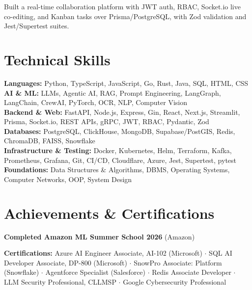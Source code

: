 \documentclass[a4paper,10pt]{article}
\begin{document}
\begin{points}
  \item Built a real-time collaboration platform with JWT auth, RBAC, Socket.io live co-editing, and Kanban tasks over Prisma/PostgreSQL, with Zod validation and Jest/Supertest suites.
\end{points}

\section{Technical Skills}
{\small
\textbf{Languages:} Python, TypeScript, JavaScript, Go, Rust, Java, SQL, HTML, CSS\\
\textbf{AI \& ML:} LLMs, Agentic AI, RAG, Prompt Engineering, LangGraph, LangChain, CrewAI, PyTorch, OCR, NLP, Computer Vision\\
\textbf{Backend \& Web:} FastAPI, Node.js, Express, Gin, React, Next.js, Streamlit, Prisma, Socket.io, REST APIs, gRPC, JWT, RBAC, Pydantic, Zod\\
\textbf{Databases:} PostgreSQL, ClickHouse, MongoDB, Supabase/PostGIS, Redis, ChromaDB, FAISS, Snowflake\\
\textbf{Infrastructure \& Testing:} Docker, Kubernetes, Helm, Terraform, Kafka, Prometheus, Grafana, Git, CI/CD, Cloudflare, Azure, Jest, Supertest, pytest\\
\textbf{Foundations:} Data Structures \& Algorithms, DBMS, Operating Systems, Computer Networks, OOP, System Design}

\section{Achievements \& Certifications}
\begin{points}
  \item \ieeepaper
  \item \textbf{Completed Amazon ML Summer School 2026} (Amazon)
\end{points}
\vspace{2pt}
{\small\textbf{Certifications:} Azure AI Engineer Associate, AI-102 (Microsoft) $\cdot$ SQL AI Developer Associate, DP-800 (Microsoft) $\cdot$ SnowPro Associate: Platform (Snowflake) $\cdot$ Agentforce Specialist (Salesforce) $\cdot$ Redis Associate Developer $\cdot$ LLM Security Professional, CLLMSP $\cdot$ Google Cybersecurity Professional}
\end{document}
